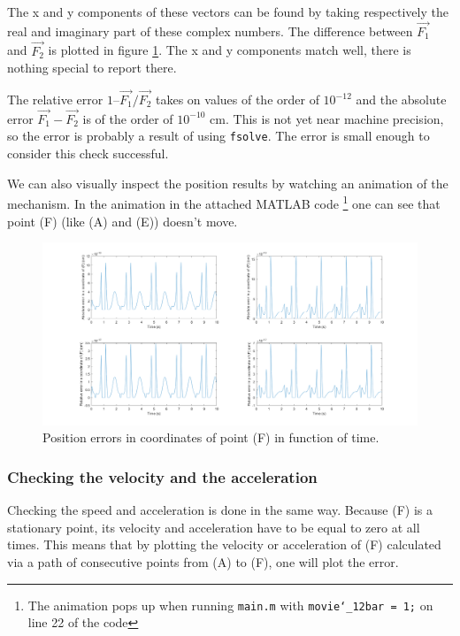 \documentclass[a4paper]{article}
\begin{document}
The x and y components of these vectors can be found by taking respectively the real and imaginary part of these complex numbers. The difference between \(\vec{F_1}\) and \(\vec{F_2}\) is plotted in figure \ref{fig:contrpos}. The x and y components match well, there is nothing special to report there. 

The relative error \(1 – \vec{F_1}/\vec{F_2}\) takes on values of the order of \(10^{-12}\) and the absolute error \(\vec{F_1}-\vec{F_2}\) is of the order of \(10^{-10}\) cm. This is not yet near machine precision, so the error is probably a result of using \texttt{fsolve}. The error is small enough to consider this check successful.

We can also visually inspect the position results by watching an animation of the mechanism. In the animation in the attached MATLAB code \footnote{The animation pops up when running \texttt{main.m} with \texttt{movie\char`_12bar = 1;} on line 22 of the code} one can see that point (F) (like (A) and (E)) doesn’t move.

\begin{figure}
	\centering
	
	\includegraphics[width = \textwidth]{contrpos.png}
	
	\caption{Position errors in coordinates of point (F) in function of time.}
	\label{fig:contrpos}
	
\end{figure}

\subsubsection{Checking the velocity and the acceleration}

Checking the speed and acceleration is done in the same way. Because (F) is a stationary point, its velocity and acceleration have to be equal to zero at all times. This means that by plotting the velocity or acceleration of (F) calculated via a path of consecutive points from (A) to (F), one will plot the error.
\end{document}
